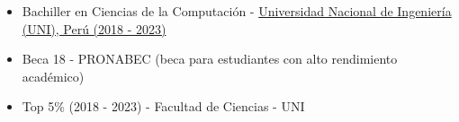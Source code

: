 %
%
%


\twocolumnsection
{
\vspace{1em}
\begin{itemize}
    \item Bachiller en Ciencias de la Computación - \href{https://www.uni.edu.pe/}{Universidad Nacional de Ingeniería (UNI), Perú (2018 - 2023)}
\end{itemize}
}
{
\vspace{1em}
\begin{itemize}
\item Beca 18 - PRONABEC (beca para estudiantes con alto rendimiento académico)
\item Top 5\% (2018 - 2023) - Facultad de Ciencias - UNI
\end{itemize}
}
